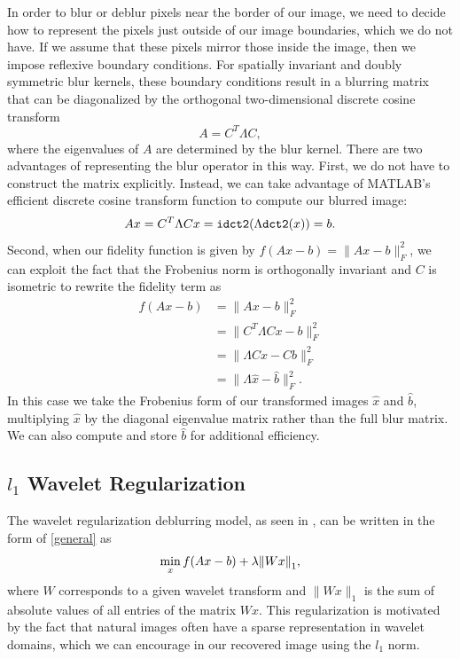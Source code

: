 \documentclass[10pt,a4paper]{article}
\begin{document}
	In order to blur or deblur pixels near the border of our image, we need to decide how to represent the pixels just outside of our image boundaries, which we do not have. If we assume that these pixels mirror those inside the image, then we impose reflexive boundary conditions. For spatially invariant and doubly symmetric blur kernels, these boundary conditions result in a blurring matrix that can be diagonalized by the orthogonal two-dimensional discrete cosine transform
	\begin{equation}
	A = C^T \Lambda C,
	\end{equation}
	where the eigenvalues of $A$ are determined by the blur kernel. There are two advantages of representing the blur operator in this way. First, we do not have to construct the matrix explicitly. Instead, we can take advantage of MATLAB's efficient discrete cosine transform function to compute our blurred image:
	\begin{equation}
	Ax = C^T \Lambda C x = {\tt idct2}( \Lambda {\tt dct2}(x)) = b.
	\end{equation}
	Second, when our fidelity function is given by $f(Ax -b) = \| Ax - b \|_F^2$, we can exploit the fact that the Frobenius norm is orthogonally invariant and $C$ is isometric to rewrite the fidelity term as
	\begin{align*}
	f(Ax - b) &= \| Ax - b \|_F^2 \\
	&= \| C^T \Lambda C x - b \|_F^2 \\
	&= \| \Lambda Cx - Cb \|_F^2 \\
	&= \| \Lambda \hat{x} - \hat{b} \|_F^2.
	\end{align*}
	In this case we take the Frobenius form of our transformed images $\hat x$ and $\hat b$, multiplying $\hat x$ by the diagonal eigenvalue matrix rather than the full blur matrix. We can also compute and store $\hat b$ for additional efficiency. 
	
	\subsection{$l_1$ Wavelet Regularization}
	
	The wavelet regularization deblurring model, as seen in \cite{FISTA}, can be written in the form of \eqref{general} as 
	\begin{equation} \label{wavelet_orig}
	\min_{x} f(Ax-b) + \lambda \norm{Wx}_1 ,
	\end{equation}
	where $W$ corresponds to a given wavelet transform and $\|Wx\|_1$ is the sum of absolute values of all entries of the matrix $Wx$. This regularization is motivated by the fact that natural images often have a sparse representation in wavelet domains, which we can encourage in our recovered image using the $l_1$ norm. 
	
\end{document}
